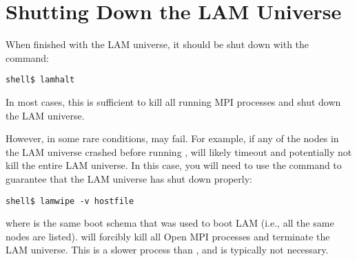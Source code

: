 
\section{Shutting Down the LAM Universe}
\label{sec:getting-started-lamhalt}

When finished with the LAM universe, it should be shut down with the
 command:

\lstset{style=lam-cmdline}
\begin{lstlisting}
shell$ lamhalt
\end{lstlisting}

In most cases, this is sufficient to kill all running MPI processes
and shut down the LAM universe.

However, in some rare conditions,  may fail.  For
example, if any of the nodes in the LAM universe crashed before
running ,  will likely timeout and
potentially not kill the entire LAM universe.  In this case, you will
need to use the  command to guarantee that the LAM
universe has shut down properly:

\lstset{style=lam-cmdline}
\begin{lstlisting}
shell$ lamwipe -v hostfile
\end{lstlisting}

\noindent where  is the same boot schema that was used to
boot LAM (i.e., all the same nodes are listed).   will
forcibly kill all Open MPI processes and terminate the LAM universe.
This is a slower process than , and is typically not
necessary.

